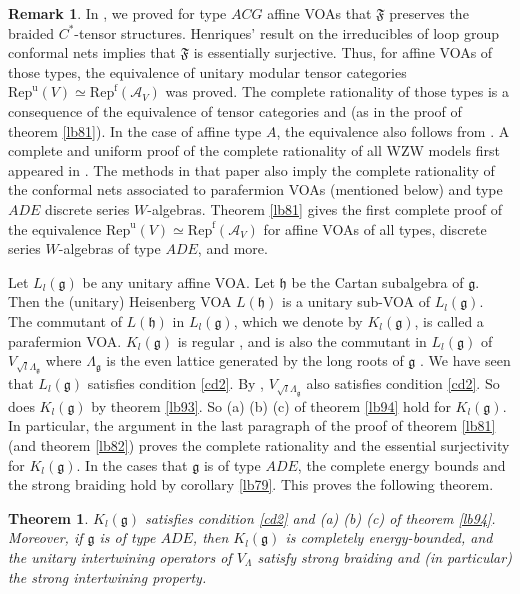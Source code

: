 \documentclass[11pt,b5paper,notitlepage]{article}
\theoremstyle{definition}
\newtheorem{rem}[df]{Remark}
\theoremstyle{plain}
\newtheorem{thm}[df]{Theorem}
\newcommand{\fk}{\mathfrak}
\newcommand{\mc}{\mathcal}
\newcommand{\gk}{\mathfrak g}
\newcommand{\hk}{\mathfrak h}
\newcommand{\Repf}{\mathrm{Rep}^{\mathrm f}}
\newcommand{\RepuV}{\mathrm{Rep}^{\mathrm u}(V)}
\numberwithin{equation}{subsection}
\begin{document}
\begin{rem}
In \cite{Gui21a}, we proved for type $ACG$ affine VOAs that $\fk F$ preserves the braided $C^*$-tensor structures. Henriques' result on the irreducibles of loop group conformal nets \cite{Hen19} implies that $\fk F$ is essentially surjective. Thus, for affine VOAs of those types, the equivalence of unitary modular tensor categories $\RepuV\simeq\Repf(\mc A_V)$ was proved. The complete rationality of those types is a consequence of the equivalence of tensor categories and  \cite{LX04,MTW18} (as in the proof of theorem \ref{lb81}). In the case of affine type $A$, the equivalence also follows from \cite{CCP}. A complete and uniform proof of the complete rationality of all WZW models first appeared in \cite{Ten24}. The methods in that paper also imply the complete rationality of the conformal nets associated to parafermion VOAs (mentioned below) and type $ADE$ discrete series $W$-algebras. Theorem \ref{lb81} gives the first complete proof of the equivalence $\RepuV\simeq\Repf(\mc A_V)$ for  affine VOAs of all types,  discrete series $W$-algebras of type $ADE$, and more.
\end{rem}


Let $L_l(\gk)$ be any unitary affine VOA. Let $\fk h$ be the Cartan subalgebra of $\gk$. Then the (unitary) Heisenberg VOA $L(\hk)$ is a unitary sub-VOA of $L_l(\gk)$. The commutant of $L(\hk)$ in $L_l(\gk)$, which we denote by $K_l(\gk)$, is called a parafermion VOA.  $K_l(\gk)$ is regular \cite{DW11a,ALY14,DR17}, and is also the commutant in $L_l(\gk)$ of $V_{\sqrt l\Lambda_\gk}$ where $\Lambda_\gk$ is the even lattice generated by the long roots of $\gk$ \cite{DW11b}. We have seen that $L_l(\gk)$ satisfies condition \ref{cd2}. By \cite{Gui21a}, $V_{\sqrt l\Lambda_\gk}$ also satisfies condition \ref{cd2}. So does $K_l(\gk)$ by theorem \ref{lb93}. So (a) (b) (c) of theorem \ref{lb94} hold for $K_l(\gk)$. In particular, the argument in the last paragraph  of the proof of theorem \ref{lb81} (and theorem \ref{lb82}) proves the complete rationality and the essential surjectivity for $K_l(\gk)$. In the cases that $\gk$ is of type $ADE$, the complete energy bounds and the strong braiding hold by corollary \ref{lb79}. This proves the following theorem.


\begin{thm}
$K_l(\gk)$ satisfies condition \ref{cd2} and (a) (b) (c) of theorem \ref{lb94}. Moreover, if $\gk$ is of type $ADE$, then $K_l(\gk)$ is completely energy-bounded, and the unitary intertwining operators of $V_\Lambda$ satisfy strong braiding and (in particular) the strong intertwining property. 
\end{thm}
\end{document}
